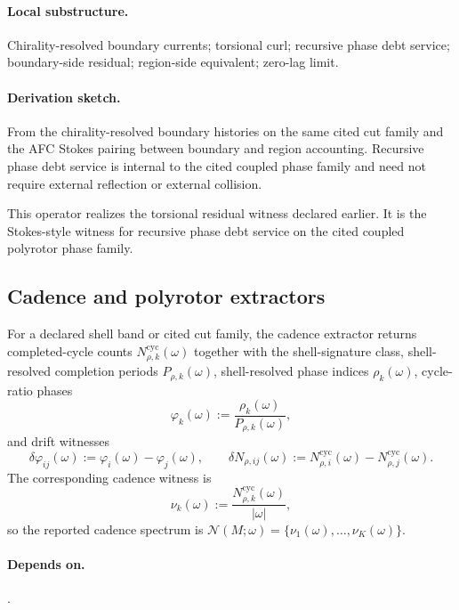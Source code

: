 \paragraph{Local substructure.} Chirality-resolved boundary currents; torsional curl; recursive phase debt service; boundary-side residual; region-side equivalent; zero-lag limit.
\paragraph{Derivation sketch.} From the chirality-resolved boundary histories on the same cited cut family and the AFC Stokes pairing between boundary and region accounting. Recursive phase debt service is internal to the cited coupled phase family and need not require external reflection or external collision.
\begin{remarkx}
This operator realizes the torsional residual witness declared earlier. It is the Stokes-style witness for recursive phase debt service on the cited coupled polyrotor phase family.
\end{remarkx}

\subsection{Cadence and polyrotor extractors}\label{subsec:cadence-polyrotor-operators}
\begin{definition}
\label{def:cadence-operator}
For a declared shell band or cited cut family, the cadence extractor returns completed-cycle counts $N_{\rho,k}^{\mathrm{cyc}}(\omega)$ together with the shell-signature class, shell-resolved completion periods $P_{\rho,k}(\omega)$, shell-resolved phase indices $\rho_k(\omega)$, cycle-ratio phases
\[
\varphi_k(\omega):=\frac{\rho_k(\omega)}{P_{\rho,k}(\omega)},
\]
and drift witnesses
\[
\delta\varphi_{ij}(\omega):=\varphi_i(\omega)-\varphi_j(\omega),
\qquad
\delta N_{\rho,ij}(\omega):=N_{\rho,i}^{\mathrm{cyc}}(\omega)-N_{\rho,j}^{\mathrm{cyc}}(\omega).
\]
The corresponding cadence witness is
\[
\nu_k(\omega):=\frac{N_{\rho,k}^{\mathrm{cyc}}(\omega)}{|\omega|},
\]
so the reported cadence spectrum is $\mathcal N(M;\omega)=\{\nu_1(\omega),\ldots,\nu_K(\omega)\}$.
\end{definition}

\paragraph{Depends on.} .
